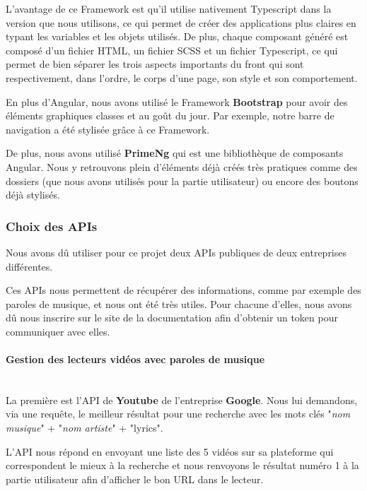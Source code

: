 \documentclass[12pt,french]{article}
\begin{document}
\medskip

L'avantage de ce Framework est qu'il utilise nativement Typescript dans la version que nous utilisons, ce qui permet de créer des applications plus claires en typant les variables et les objets utilisés. De plus, chaque composant généré est composé d'un fichier HTML, un fichier SCSS et un fichier Typescript, ce qui permet de bien séparer les trois aspects importants du front qui sont respectivement, dans l'ordre, le corps d'une page, son style et son comportement.

\bigskip

En plus d'Angular, nous avons utilisé le Framework \textbf{Bootstrap} pour avoir des éléments graphiques classes et au goût du jour. Par exemple, notre barre de navigation a été stylisée grâce à ce Framework.

De plus, nous avons utilisé \textbf{PrimeNg} qui est une bibliothèque de composants Angular. Nous y retrouvons plein d'éléments déjà créés très pratiques comme des dossiers (que nous avons utilisés pour la partie utilisateur) ou encore des boutons déjà stylisés.


\subsubsection{Choix des APIs}

Nous avons dû utiliser pour ce projet deux APIs publiques de deux entreprises différentes.

\medskip

Ces APIs nous permettent de récupérer des informations, comme par exemple des paroles de musique, et nous ont été très utiles. Pour chacune d'elles, nous avons dû nous inscrire sur le site de la documentation afin d'obtenir un token pour communiquer avec elles.

\paragraph{Gestion des lecteurs vidéos avec paroles de musique \\\\}

La première est l'API de \textbf{Youtube} de l'entreprise \textbf{Google}. Nous lui demandons, via une requête, le meilleur résultat pour une recherche avec les mots clés "\textit{nom musique}" + "\textit{nom artiste}" + "lyrics".

L'API nous répond en envoyant une liste des 5 vidéos sur sa plateforme qui correspondent le mieux à la recherche et nous renvoyons le résultat numéro 1 à la partie utilisateur afin d'afficher le bon URL dans le lecteur.
\end{document}
